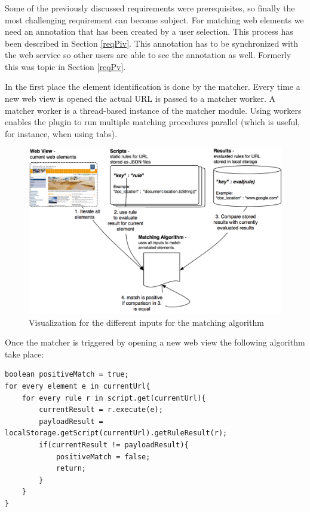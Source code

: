 \subsubsection[Web Element Identification]{\reqPvii}
Some of the previously discussed requirements were prerequisites, so finally the most challenging requirement can become subject. 
For matching web elements we need an annotation that has been created by a user selection. This process has been described in Section \ref{reqPiv}. This annotation has to be synchronized with the web service so other users are able to see the annotation as well. Formerly this was topic in Section \ref{reqPv}. 

In the first place the element identification is done by the matcher. Every time a new web view is opened the actual URL is passed to a matcher worker. A matcher worker is a thread-based instance of the matcher module. Using workers enables the plugin to run multiple matching procedures parallel (which is useful, for instance, when using tabs). 

\begin{figure}\centering
	\includegraphics[width=13cm]{images/matching-algorithm.png}
\caption{Visualization for the different inputs for the matching algorithm}
\label{matching-algorithm}
\end{figure}

Once the matcher is triggered by opening a new web view the following algorithm take place:
\begin{lstlisting}
boolean positiveMatch = true;
for every element e in currentUrl{
	for every rule r in script.get(currentUrl){
		currentResult = r.execute(e);
		payloadResult = localStorage.getScript(currentUrl).getRuleResult(r);
		if(currentResult != payloadResult){
			positiveMatch = false;
			return;
		}
	}
}
\end{lstlisting}

